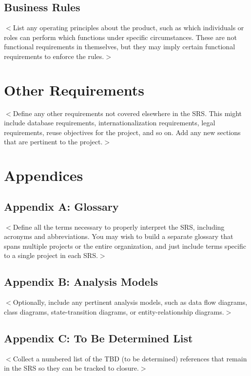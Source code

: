 \documentclass[oneside,a4paper,12pt,explicit]{book}
\begin{document}
\section{Business Rules}
$<$List any operating principles about the product, such as which individuals or 
roles can perform which functions under specific circumstances. These are not 
functional requirements in themselves, but they may imply certain functional 
requirements to enforce the rules.$>$


\chapter{Other Requirements}
$<$Define any other requirements not covered elsewhere in the SRS. This might 
include database requirements, internationalization requirements, legal 
requirements, reuse objectives for the project, and so on. Add any new sections 
that are pertinent to the project.$>$

\chapter{Appendices}
\section{Appendix A: Glossary}
$<$Define all the terms necessary to properly interpret the SRS, including 
acronyms and abbreviations. You may wish to build a separate glossary that spans 
multiple projects or the entire organization, and just include terms specific to 
a single project in each SRS.$>$

\section{Appendix B: Analysis Models}
$<$Optionally, include any pertinent analysis models, such as data flow 
diagrams, class diagrams, state-transition diagrams, or entity-relationship 
diagrams.$>$

\section{Appendix C: To Be Determined List}
$<$Collect a numbered list of the TBD (to be determined) references that remain 
in the SRS so they can be tracked to closure.$>$
\cleardoublepage
{}
\printindex
\end{document}
